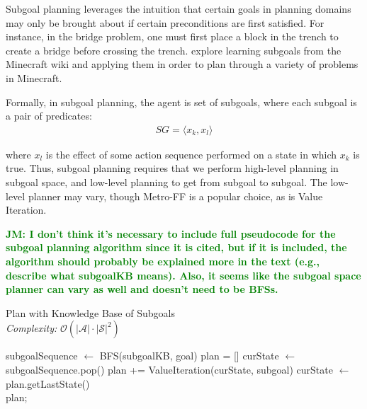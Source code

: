 \documentclass[]{article}
\newcommand{\jmnote}[1]{\textcolor{Green}{\textbf{JM: #1}}}
\begin{document}
Subgoal planning leverages the intuition that certain goals in
planning domains may only be brought about if certain preconditions
are first satisfied. For instance, in the bridge problem, one must
first place a block in the trench to create a bridge before crossing
the trench.  \citet{branavan12a} explore learning subgoals from the
Minecraft wiki and applying them in order to plan through a variety of
problems in Minecraft.  

Formally, in subgoal planning, the agent is set of subgoals, where each subgoal is a pair of predicates:
\begin{align}
SG = \langle x_k, x_l \rangle
\end{align}

where $x_l$ is the effect of some action sequence performed on 
a state in which $x_k$ is true. Thus, subgoal planning requires 
that we perform high-level planning in subgoal space, and low-level 
planning to get from subgoal to subgoal. The low-level planner may vary, though
Metro-FF is a popular choice, as is Value Iteration.

\jmnote{I don't think it's necessary to include full pseudocode for the subgoal planning algorithm
since it is cited, but if it is included, the algorithm should probably be explained more in the text
(e.g., describe what subgoalKB means). Also, it seems like the subgoal space planner can
vary as well and doesn't need to be BFSs.}

\begin{algorithm}
  \caption{Plan with Knowledge Base of Subgoals \\ {\it Complexity:} $\mathcal{O}(|\mathcal{A}|\cdot |\mathcal{S}|^2)$}
  \begin{algorithmic}[1]
    \State subgoalSequence $\gets$ BFS(subgoalKB, goal)
    \State plan = []
    \State curState $\gets$ subgoalSequence.pop()
        \State plan += ValueIteration(curState, subgoal)
    \State curState $\gets$ plan.getLastState()
    \EndFor \\
    \Return plan;
  \end{algorithmic}
\end{algorithm}
\end{document}
